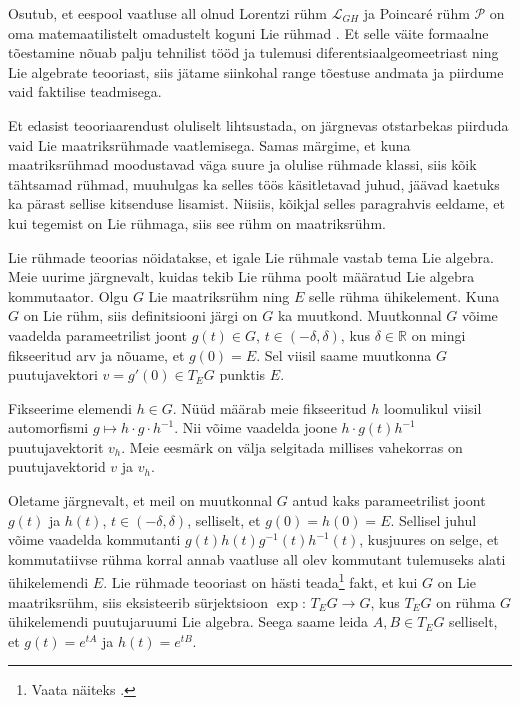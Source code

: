 \documentclass[12pt,a4paper,oneside]{article}
\theoremstyle{plain}
\theoremstyle{definition}
\numberwithin{equation}{section}
\def\R{{\mathbb R}}
\def\L{{\mathcal L}}
\def\P{{\mathcal P}}
\begin{document}
Osutub, et eespool vaatluse all olnud Lorentzi rühm $\L_{GH}$ ja 
Poincar\'e rühm $\P$ on oma matemaatilistelt omadustelt koguni Lie 
rühmad \cite[peatükk Poincar\'e algebra]{Super}. Et selle väite 
formaalne tõestamine nõuab palju tehnilist tööd ja tulemusi 
diferentsiaalgeomeetriast ning Lie algebrate teooriast, siis jätame 
siinkohal range tõestuse andmata ja piirdume vaid faktilise 
teadmisega.

Et edasist teooriaarendust oluliselt lihtsustada, on järgnevas 
otstarbekas piirduda vaid Lie maatriksrühmade vaatlemisega. Samas 
märgime, et kuna maatriksrühmad moodustavad väga suure ja olulise 
rühmade klassi, siis kõik tähtsamad rühmad, muuhulgas ka selles töös 
käsitletavad juhud, jäävad kaetuks ka pärast sellise kitsenduse 
lisamist. Niisiis, kõikjal selles paragrahvis eeldame, et kui 
tegemist on Lie rühmaga, siis see rühm on maatriksrühm.

Lie rühmade teoorias nöidatakse, et igale Lie rühmale vastab tema 
Lie algebra. Meie uurime järgnevalt, kuidas tekib Lie rühma poolt 
määratud Lie algebra kommutaator. Olgu $G$ Lie maatriksrühm ning $E$ 
selle rühma ühikelement. Kuna $G$ on Lie rühm, siis definitsiooni 
järgi on $G$ ka muutkond. Muutkonnal $G$ võime vaadelda 
parameetrilist joont 
$g\left(t\right) \in G$, $t \in \left(-\delta, \delta\right)$, kus 
$\delta \in \R$ on mingi fikseeritud arv ja nõuame, et 
$g\left(0\right) = E$. Sel viisil saame muutkonna $G$ puutujavektori 
$v = g'\left(0\right) \in T_E G$ punktis $E$.

Fikseerime elemendi $h \in G$. Nüüd määrab meie fikseeritud $h$ 
loomulikul viisil automorfismi $g \mapsto h \cdot g \cdot h^{-1}$. 
Nii võime vaadelda joone $h \cdot g\left(t\right) h^{-1}$ 
puutujavektorit $v_h$. Meie eesmärk on välja selgitada millises 
vahekorras on puutujavektorid $v$ ja $v_h$.

Oletame järgnevalt, et meil on muutkonnal $G$ antud kaks 
parameetrilist joont $g\left(t\right)$ ja $h\left(t\right)$, 
$t \in \left(-\delta, \delta\right)$, selliselt, et 
$g\left(0\right) = h\left(0\right) = E$. Sellisel juhul võime 
vaadelda kommutanti $g\left(t\right) h\left(t\right) 
g^{-1}\left(t\right) h^{-1}\left(t\right)$, kusjuures on selge, et 
kommutatiivse rühma korral annab vaatluse all olev kommutant 
tulemuseks alati ühikelemendi $E$. Lie rühmade teooriast on hästi 
teada\footnote{Vaata näiteks \cite[Exponential map]{Kirillov}.} fakt, 
et kui $G$ on Lie maatriksrühm, siis eksisteerib sürjektsioon 
$\exp \colon\, T_E G \rightarrow G$, kus $T_E G$ on rühma $G$ ühikelemendi 
puutujaruumi Lie algebra. Seega saame leida $A, B \in T_E G$ 
selliselt, et $g\left(t\right) = e^{tA}$ ja $h\left(t\right) = 
e^{tB}$. 
\end{document}
